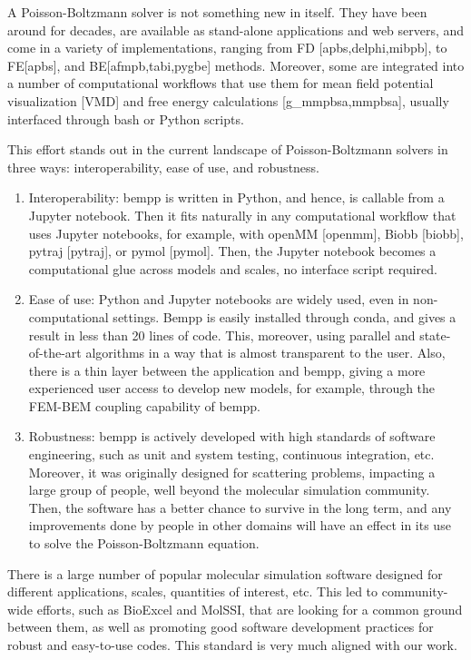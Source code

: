 A Poisson-Boltzmann solver is not something new in itself. They have been around for decades, are available as stand-alone applications and web servers, and come in a variety of implementations, ranging from FD [apbs,delphi,mibpb], to FE[apbs], and BE[afmpb,tabi,pygbe] methods. Moreover, some are integrated into a number of computational workflows that use them for mean field potential visualization [VMD] and free energy calculations [g\_mmpbsa,mmpbsa], usually interfaced through bash or Python scripts.

This effort stands out in the current landscape of Poisson-Boltzmann solvers in three ways: interoperability, ease of use, and robustness. 
\begin{enumerate}
\item Interoperability: bempp is written in Python, and hence, is callable from a Jupyter notebook. Then it fits naturally in any computational workflow that uses Jupyter notebooks, for example, with openMM [openmm], Biobb [biobb], pytraj [pytraj], or pymol [pymol]. Then, the Jupyter notebook becomes a computational glue across models and scales, no interface script required. 

\item Ease of use: Python and Jupyter notebooks are widely used, even in non-computational settings. Bempp is easily installed through conda, and gives a result in less than 20 lines of code. This, moreover, using parallel and state-of-the-art algorithms in a way that is almost transparent to the user. Also, there is a thin layer between the application and bempp, giving a more experienced user access to develop new models, for example, through the FEM-BEM coupling capability of bempp.

\item Robustness: bempp is actively developed with high standards of software engineering, such as unit and system testing, continuous integration, etc. Moreover, it was originally designed for scattering problems, impacting a large group of people, well beyond the molecular simulation community. Then, the software has a better chance to survive in the long term, and any improvements done by people in other domains will have an effect in its use to solve the Poisson-Boltzmann equation. 
\end{enumerate}

There is a large number of popular molecular simulation software designed for different applications, scales, quantities of interest, etc. This led to community-wide efforts, such as BioExcel and MolSSI, that are looking for a common ground between them, as well as promoting good software development practices for robust and easy-to-use codes. This standard is very much aligned with our work.

